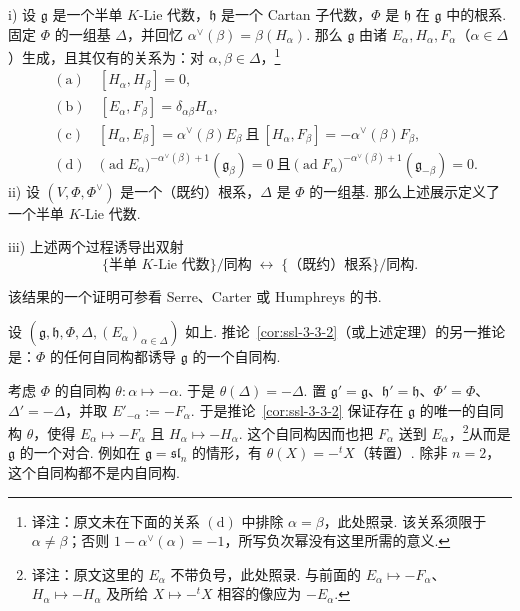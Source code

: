 \begin{theorem*}
i) 设 $\mathfrak g$ 是一个半单 $K$-Lie 代数，$\mathfrak h$ 是一个 Cartan 子代数，$\Phi$ 是 $\mathfrak h$ 在 $\mathfrak g$ 中的根系. 固定 $\Phi$ 的一组基 $\Delta$，并回忆 $\alpha^{\vee}(\beta)=\beta(H_{\alpha})$. 那么 $\mathfrak g$ 由诸 $E_{\alpha},H_{\alpha},F_{\alpha}$（$\alpha\in\Delta$）生成，且其仅有的关系为：对 $\alpha,\beta\in\Delta$，\footnote{译注：原文未在下面的关系 $(\mathrm d)$ 中排除 $\alpha=\beta$，此处照录. 该关系须限于 $\alpha\neq\beta$；否则 $1-\alpha^\vee(\alpha)=-1$，所写负次幂没有这里所需的意义.}
\[
\begin{aligned}
&(\mathrm a)\quad [H_{\alpha},H_{\beta}]=0,\\
&(\mathrm b)\quad [E_{\alpha},F_{\beta}]=\delta_{\alpha\beta}H_{\alpha},\\
&(\mathrm c)\quad [H_{\alpha},E_{\beta}]=\alpha^{\vee}(\beta)E_{\beta}\ \text{且}\ [H_{\alpha},F_{\beta}]=-\alpha^{\vee}(\beta)F_{\beta},\\
&(\mathrm d)\quad \bigl(\operatorname{ad}E_{\alpha}\bigr)^{-\alpha^{\vee}(\beta)+1}(\mathfrak g_{\beta})=0\ \text{且}\ \bigl(\operatorname{ad}F_{\alpha}\bigr)^{-\alpha^{\vee}(\beta)+1}(\mathfrak g_{-\beta})=0.
\end{aligned}
\]
ii) 设 $(V,\Phi,\Phi^{\vee})$ 是一个（既约）根系，$\Delta$ 是 $\Phi$ 的一组基. 那么上述展示定义了一个半单 $K$-Lie 代数.

iii) 上述两个过程诱导出双射
\[
\bigl\{\text{半单 }K\text{-Lie 代数}\bigr\}/\text{同构}\;\longleftrightarrow\;\bigl\{\text{（既约）根系}\bigr\}/\text{同构}.
\]
\end{theorem*}
该结果的一个证明可参看 Serre、Carter 或 Humphreys 的书.
\begin{numpara}[自同构]\label{np:ssl-3-3-5}
设 $(\mathfrak g,\mathfrak h,\Phi,\Delta,(E_{\alpha})_{\alpha\in\Delta})$ 如上. 推论~\ref{cor:ssl-3-3-2}（或上述定理）的另一推论是：$\Phi$ 的任何自同构都诱导 $\mathfrak g$ 的一个自同构.
\end{numpara}
\begin{example*}
考虑 $\Phi$ 的自同构 $\theta:\alpha\mapsto-\alpha$. 于是 $\theta(\Delta)=-\Delta$. 置 $\mathfrak g'=\mathfrak g$、$\mathfrak h'=\mathfrak h$、$\Phi'=\Phi$、$\Delta'=-\Delta$，并取 $E'_{-\alpha}:=-F_{\alpha}$. 于是推论~\ref{cor:ssl-3-3-2} 保证存在 $\mathfrak g$ 的唯一的自同构 $\theta$，使得 $E_{\alpha}\mapsto-F_{\alpha}$ 且 $H_{\alpha}\mapsto-H_{\alpha}$. 这个自同构因而也把 $F_{\alpha}$ 送到 $E_{\alpha}$，\footnote{译注：原文这里的 $E_\alpha$ 不带负号，此处照录. 与前面的 $E_\alpha\mapsto-F_\alpha$、$H_\alpha\mapsto-H_\alpha$ 及所给 $X\mapsto-{}^tX$ 相容的像应为 $-E_\alpha$.}从而是 $\mathfrak g$ 的一个对合. 例如在 $\mathfrak g=\mathfrak{sl}_n$ 的情形，有 $\theta(X)=-{}^{t}X$（转置）. 除非 $n=2$，这个自同构都不是内自同构.
\end{example*}
